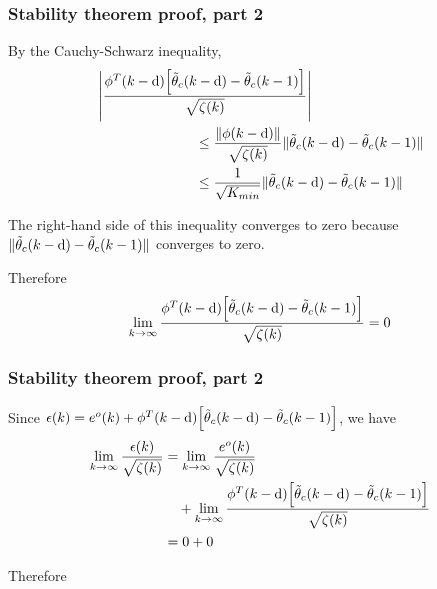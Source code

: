 \begin{frame}
    \frametitle{Stability theorem proof, part 2}

    By the Cauchy-Schwarz inequality,
    \begin{align*}
        & \left| \frac{ \phi^T(k-\textrm{d}) \Big[ \tilde{\theta}_c(k-\textrm{d}) - \tilde{\theta}_c(k-1) \Big] }
            { \sqrt{\zeta(k)} } \right| \\
        & \hspace{2.5cm} \leq \frac{ \| \phi(k-\textrm{d}) \| }{ \sqrt{\zeta(k)} } \|
            \tilde{\theta}_c(k-\textrm{d}) - \tilde{\theta}_c(k-1) \| \\
        & \hspace{2.5cm} \leq \frac{1}{ \sqrt{K_{min}} }
            \| \tilde{\theta}_c(k-\textrm{d}) - \tilde{\theta}_c(k-1) \|
    \end{align*}
    \pause
    
    The right-hand side of this inequality converges to zero because $\| \tilde{\theta}_c(k-\textrm{d}) - \tilde{\theta}_c(k-1) \|$ converges to zero.
    \pause
    
    Therefore
    \begin{align*}
        \lim_{k\rightarrow \infty} \frac{ \phi^T(k-\textrm{d}) \Big[ \tilde{\theta}_c(k-\textrm{d}) - \tilde{\theta}_c(k-1) \Big] }
            { \sqrt{\zeta(k)} } = 0
    \end{align*}

\end{frame}

\begin{frame}
    \frametitle{Stability theorem proof, part 2}

    Since $\epsilon(k) =  e^o(k) + \phi^T(k-\textrm{d}) \Big[ \tilde{\theta}_c(k-\textrm{d}) - \tilde{\theta}_c(k-1) \Big]$, we have
    \begin{align*}
        \lim_{k \rightarrow \infty} \frac{ \epsilon(k) }{ \sqrt{\zeta(k)} }
            & = \lim_{k \rightarrow \infty} \frac{ e^o(k) }{ \sqrt{\zeta(k)} } \\
        & \quad + \lim_{k \rightarrow \infty} \frac{ \phi^T(k-\textrm{d}) \Big[ \tilde{\theta}_c(k-\textrm{d})
            - \tilde{\theta}_c(k-1) \Big] }{ \sqrt{\zeta(k)} } \\
        & = 0 + 0
    \end{align*}
    \pause

    Therefore

\end{frame}



